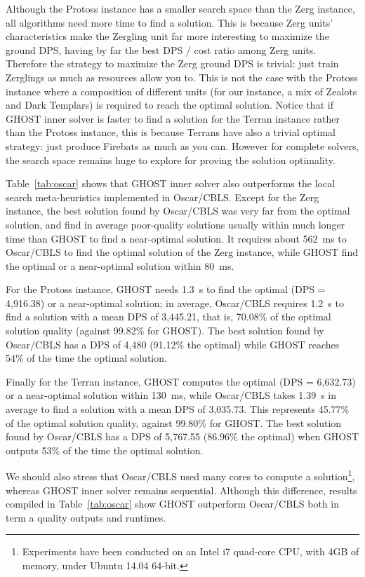 \documentclass[journal]{IEEEtran}
\newcommand{\ghost}{\textsc{GHOST}\xspace}
\begin{document}
{Although the Protoss instance has a smaller search space than the Zerg
instance, all algorithms  need more time to find a  solution.  This is
because Zerg  units' characteristics make  the Zergling unit  far more
interesting to maximize  the ground DPS, having by far  the best DPS /
cost ratio among  Zerg units.  Therefore the strategy  to maximize the
Zerg ground DPS is trivial: just  train Zerglings as much as resources
allow you to. This  is not the case with the  Protoss instance where a
composition of different units (for our instance, a mix of Zealots and
Dark Templars) is required to  reach the optimal solution. Notice that
if \ghost  inner solver is  faster to find  a solution for  the Terran
instance rather  than the  Protoss instance,  this is  because Terrans
have also a trivial optimal strategy: just produce Firebats as much as
you can. However  for complete solvers, the search  space remains huge
to explore for proving the solution optimality.

Table~\ref{tab:oscar} shows that \ghost  inner solver also outperforms
the local search meta-heuristics implemented in Oscar/CBLS. Except for
the Zerg instance, the best solution  found by Oscar/CBLS was very far
from the optimal solution, and  find in average poor-quality solutions
usually within  much longer  time than \ghost  to find  a near-optimal
solution. It  requires about 562~ms  to Oscar/CBLS to find  the optimal
solution of  the Zerg  instance, while  \ghost find  the optimal  or a
near-optimal solution within 80~ms.  

For the Protoss instance, \ghost needs 1.3~s to find the optimal (DPS =
4,916.38) or a near-optimal  solution; in average, Oscar/CBLS requires
1.2~s to find a solution with a  mean DPS of 3,445.21, that is, 70.08\%
of the optimal solution quality (against 99.82\% for \ghost). The best
solution found by Oscar/CBLS has a  DPS of 4,480 (91.12\% the optimal)
while \ghost reaches 54\% of the time the optimal solution.

Finally for  the Terran instance,  \ghost computes the optimal  (DPS =
6,632.73) or  a near-optimal  solution within 130~ms,  while Oscar/CBLS
takes 1.39~s in average to find a solution with a mean DPS of 3,035.73.
This  represents  45.77\% of  the  optimal  solution quality,  against
99.80\% for \ghost. The best solution found by Oscar/CBLS has a DPS of
5,767.55 (86.96\%  the optimal) when  \ghost outputs 53\% of  the time
the optimal solution.

We should also stress that Oscar/CBLS used many cores to compute a solution\footnote{Experiments have been conducted on an Intel i7 quad-core CPU, with 4GB of memory, under Ubuntu 14.04 64-bit.}, whereas \ghost inner solver remains sequential. Although this difference, results compiled in Table~\ref{tab:oscar} show \ghost outperform Oscar/CBLS both in term a quality outputs and runtimes.
}
\end{document}
